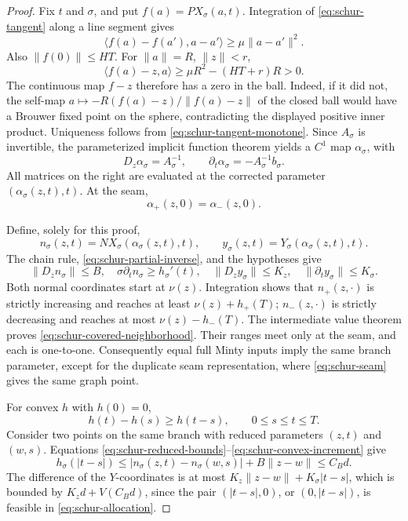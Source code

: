 \begin{proof}
Fix \(t\) and \(\sigma\), and put \(f(a)=PX_\sigma(a,t)\).
Integration of \eqref{eq:schur-tangent} along a line segment gives
\[
 \langle f(a)-f(a'),a-a'\rangle\ge\mu\|a-a'\|^2.
 \tag{S11}\label{eq:schur-tangent-monotone}
\]
Also \(\|f(0)\|\le HT\).  For \(\|a\|=R\), \(\|z\|<r\),
\[
 \langle f(a)-z,a\rangle
 \ge\mu R^2-(HT+r)R>0.
\]
The continuous map \(f-z\) therefore has a zero in the ball.  Indeed, if
it did not, the self-map
\(a\mapsto-R(f(a)-z)/\|f(a)-z\|\) of the closed ball would have a
Brouwer fixed point on the sphere, contradicting the displayed positive
inner product.  Uniqueness follows from
\eqref{eq:schur-tangent-monotone}.  Since \(A_\sigma\) is invertible,
the parameterized implicit function theorem yields a \(C^1\) map
\(\alpha_\sigma\), with
\[
 D_z\alpha_\sigma=A_\sigma^{-1},\qquad
 \partial_t\alpha_\sigma=-A_\sigma^{-1}b_\sigma.
 \tag{S12}\label{eq:schur-partial-inverse}
\]
All matrices on the right are evaluated at the corrected parameter
\((\alpha_\sigma(z,t),t)\).  At the seam,
\[
 \alpha_+(z,0)=\alpha_-(z,0).
\]

Define, solely for this proof,
\[
 n_\sigma(z,t)=NX_\sigma(\alpha_\sigma(z,t),t),\qquad
 y_\sigma(z,t)=Y_\sigma(\alpha_\sigma(z,t),t).
\]
The chain rule, \eqref{eq:schur-partial-inverse}, and the hypotheses give
\[
 \|D_zn_\sigma\|\le B,\quad
 \sigma\partial_t n_\sigma\ge h_\sigma'(t),\quad
 \|D_zy_\sigma\|\le K_z,\quad
 \|\partial_ty_\sigma\|\le K_\sigma.
 \tag{S13}\label{eq:schur-reduced-bounds}
\]
Both normal coordinates start at \(\nu(z)\).  Integration shows that
\(n_+(z,\cdot)\) is strictly increasing and reaches at least
\(\nu(z)+h_+(T)\); \(n_-(z,\cdot)\) is strictly decreasing and reaches
at most \(\nu(z)-h_-(T)\).  The intermediate value theorem proves
\eqref{eq:schur-covered-neighborhood}.  Their ranges meet only at the
seam, and each is one-to-one.  Consequently equal full Minty inputs
imply the same branch parameter, except for the duplicate seam
representation, where \eqref{eq:schur-seam} gives the same graph point.

For convex \(h\) with \(h(0)=0\),
\[
 h(t)-h(s)\ge h(t-s),\qquad 0\le s\le t\le T.
 \tag{S14}\label{eq:schur-convex-increment}
\]
Consider two points on the same branch with reduced parameters
\((z,t)\) and \((w,s)\).  Equations
\eqref{eq:schur-reduced-bounds}--\eqref{eq:schur-convex-increment} give
\[
 h_\sigma(|t-s|)
 \le|n_\sigma(z,t)-n_\sigma(w,s)|+B\|z-w\|
 \le C_Bd.
\]
The difference of the \(Y\)-coordinates is at most
\(K_z\|z-w\|+K_\sigma|t-s|\), which is bounded by
\(K_zd+V(C_Bd)\), since the pair
\((|t-s|,0)\), or \((0,|t-s|)\), is feasible in
\eqref{eq:schur-allocation}.


\end{proof}
